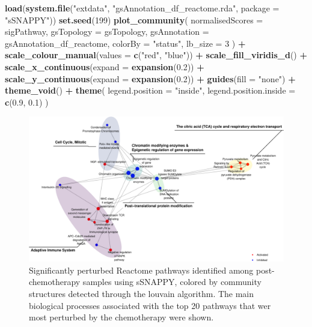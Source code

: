 \documentclass[9pt,a4paper,]{extarticle}
\newenvironment{Shaded}{\begin{snugshade}}{\end{snugshade}}
\newcommand{\AttributeTok}[1]{\textcolor[rgb]{0.13,0.29,0.53}{#1}}
\newcommand{\DecValTok}[1]{\textcolor[rgb]{0.00,0.00,0.81}{#1}}
\newcommand{\FloatTok}[1]{\textcolor[rgb]{0.00,0.00,0.81}{#1}}
\newcommand{\FunctionTok}[1]{\textcolor[rgb]{0.13,0.29,0.53}{\textbf{#1}}}
\newcommand{\NormalTok}[1]{#1}
\newcommand{\SpecialCharTok}[1]{\textcolor[rgb]{0.81,0.36,0.00}{\textbf{#1}}}
\newcommand{\StringTok}[1]{\textcolor[rgb]{0.31,0.60,0.02}{#1}}
\begin{document}
\begin{Shaded}
\begin{Highlighting}[]
\FunctionTok{load}\NormalTok{(}\FunctionTok{system.file}\NormalTok{(}\StringTok{"extdata"}\NormalTok{, }\StringTok{"gsAnnotation\_df\_reactome.rda"}\NormalTok{, }\AttributeTok{package =} \StringTok{"sSNAPPY"}\NormalTok{))}
\FunctionTok{set.seed}\NormalTok{(}\DecValTok{199}\NormalTok{)}
\FunctionTok{plot\_community}\NormalTok{(}
    \AttributeTok{normalisedScores =}\NormalTok{ sigPathway,}
    \AttributeTok{gsTopology =}\NormalTok{ gsTopology, }
    \AttributeTok{gsAnnotation =}\NormalTok{ gsAnnotation\_df\_reactome,}
    \AttributeTok{colorBy =} \StringTok{"status"}\NormalTok{,}
    \AttributeTok{lb\_size =} \DecValTok{3}
\NormalTok{) }\SpecialCharTok{+}
  \FunctionTok{scale\_colour\_manual}\NormalTok{(}\AttributeTok{values =} \FunctionTok{c}\NormalTok{(}\StringTok{"red"}\NormalTok{, }\StringTok{"blue"}\NormalTok{)) }\SpecialCharTok{+}
  \FunctionTok{scale\_fill\_viridis\_d}\NormalTok{() }\SpecialCharTok{+}
  \FunctionTok{scale\_x\_continuous}\NormalTok{(}\AttributeTok{expand =} \FunctionTok{expansion}\NormalTok{(}\FloatTok{0.2}\NormalTok{)) }\SpecialCharTok{+}
  \FunctionTok{scale\_y\_continuous}\NormalTok{(}\AttributeTok{expand =} \FunctionTok{expansion}\NormalTok{(}\FloatTok{0.2}\NormalTok{)) }\SpecialCharTok{+}
  \FunctionTok{guides}\NormalTok{(}\AttributeTok{fill =} \StringTok{"none"}\NormalTok{) }\SpecialCharTok{+}
  \FunctionTok{theme\_void}\NormalTok{() }\SpecialCharTok{+}
  \FunctionTok{theme}\NormalTok{(}
      \AttributeTok{legend.position =} \StringTok{"inside"}\NormalTok{,}
      \AttributeTok{legend.position.inside =} \FunctionTok{c}\NormalTok{(}\FloatTok{0.9}\NormalTok{, }\FloatTok{0.1}\NormalTok{)}
\NormalTok{  )}
\end{Highlighting}
\end{Shaded}

\begin{figure}

{\centering \includegraphics[width=1\linewidth]{sSNAPPY_paper_files/figure-latex/Figure5-1} 

}

\caption{Significantly perturbed Reactome pathways identified among post-chemotherapy samples using sSNAPPY, colored by community structures detected through the louvain algorithm. The main biological processes associated with the top 20 pathways that wer most perturbed by the chemotherapy were shown.}\label{fig:Figure5}
\end{figure}
\end{document}
